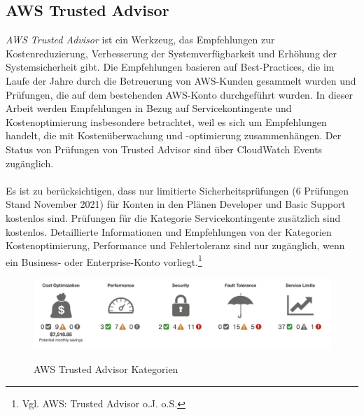 \subsection{AWS Trusted Advisor}
\textit{AWS Trusted Advisor} ist ein Werkzeug, das Empfehlungen zur Kostenreduzierung, Verbesserung der Systemverfügbarkeit und Erhöhung der Systemsicherheit gibt. Die Empfehlungen basieren auf Best-Practices, die im Laufe der Jahre durch die Betreuerung von AWS-Kunden gesammelt wurden und Prüfungen, die auf dem bestehenden AWS-Konto durchgeführt wurden.
In dieser Arbeit werden Empfehlungen in Bezug auf Servicekontingente und Kostenoptimierung insbesondere betrachtet, weil es sich um Empfehlungen handelt, die mit Kostenüberwachung und -optimierung zusammenhängen. Der Status von Prüfungen von Trusted Advisor sind über CloudWatch Events zugänglich. 
\\\\
Es ist zu berücksichtigen, dass nur limitierte Sicherheitsprüfungen (6 Prüfungen Stand November 2021) für Konten in den Plänen Developer und Basic Support kostenlos sind. Prüfungen für die Kategorie Servicekontingente zusätzlich sind kostenlos. Detaillierte Informationen und Empfehlungen von der Kategorien Kostenoptimierung, Performance und Fehlertoleranz sind nur zugänglich, wenn ein Business- oder Enterprise-Konto vorliegt.\footnote{Vgl. AWS: Trusted Advisor o.J. o.S.\cite{AMZ20}}
\\
\begin{figure}[h!]
      \centering
      \includegraphics[scale=0.4]{sources/AWS_Trusted_Advisor_Kategorien}
      \caption[AWS Trusted Advisor Kategorien]{}
      \label{fig:AWS_Trusted_Advisor_Kategorien} 
      AWS Trusted Advisor Kategorien\cite{AMZ20}
\end{figure}
